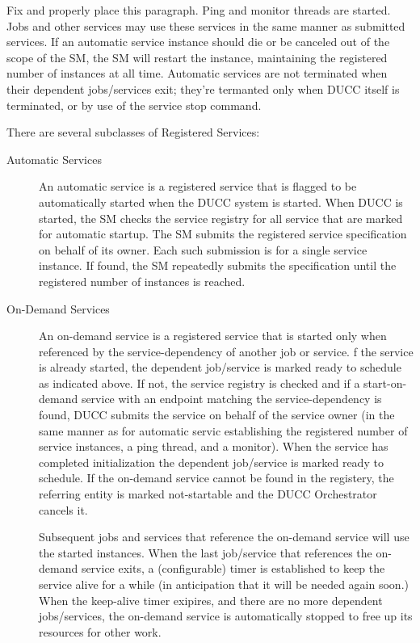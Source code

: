       \todo Fix and properly place this paragraph.
          Ping and monitor threads are started. Jobs and other services may use these services in the same
          manner as submitted services. If an automatic service instance should die or be canceled out of
          the scope of the SM, the SM will restart the instance, maintaining the registered number of
          instances at all time. Automatic services are not terminated when their dependent jobs/services
          exit; they're termanted only when DUCC itself is terminated, or by use of the service stop
          command.

      There are several subclasses of Registered Services:
      \begin{description}

        \item[Automatic Services] An automatic service is a registered service that is flagged to be
          automatically started when the DUCC system is started. When DUCC is started, the SM checks the
          service registry for all service that are marked for automatic startup. The SM submits the
          registered service specification on behalf of its owner. Each such submission is for a single
          service instance.  If found, the SM repeatedly submits the specification until the registered
          number of instances is reached.
          
        \item[On-Demand Services] An on-demand service is a registered service that is started only when
          referenced by the service-dependency of another job or service. f the service is already
          started, the dependent job/service is marked ready to schedule as indicated above. If not, the
          service registry is checked and if a start-on-demand service with an endpoint matching the
          service-dependency is found, DUCC submits the service on behalf of the service owner (in the
          same manner as for automatic servic establishing the registered number of service instances, a
          ping thread, and a monitor). When the service has completed initialization the dependent
          job/service is marked ready to schedule. If the on-demand service cannot be found in the
          registery, the referring entity is marked not-startable and the DUCC Orchestrator cancels it.
          
          Subsequent jobs and services that reference the on-demand service will use the started
          instances.  When the last job/service that references the on-demand service exits, a
          (configurable) timer is established to keep the service alive for a while (in anticipation that
          it will be needed again soon.)  When the keep-alive timer exipires, and there are no more
          dependent jobs/services, the on-demand service is automatically stopped to free up its resources
          for other work.


\end{description}
